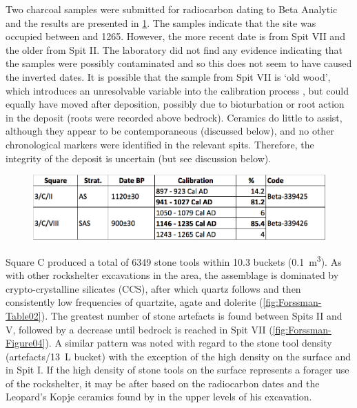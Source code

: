 \documentclass{ijsra}
\begin{document}
Two charcoal samples were submitted for radiocarbon dating to Beta Analytic and the results are presented in \cref{fig:Forssman-Table01}. 
The samples indicate that the site was occupied between  and 1265. 
However, the more recent date is from Spit VII and the older from Spit II. 
The laboratory did not find any evidence indicating that the samples were possibly contaminated and so this does not seem to have caused the inverted dates. 
It is possible that the sample from Spit VII is ‘old wood’, which introduces an unresolvable variable into the calibration process \parencite{Kennett_2002}, but could equally have moved after deposition, possibly due to bioturbation \parencite[see][]{Lancaster_2003} or root action in the deposit (roots were recorded above bedrock). 
Ceramics do little to assist, although they appear to be contemporaneous (discussed below), and no other chronological markers were identified in the relevant spits. Therefore, the integrity of the deposit is uncertain (but see discussion below).

	\begin{figure} %
		\includegraphics[width=\linewidth]{figures/Forssman-Table01}
		\label{fig:Forssman-Table01}
	\end{figure}


Square C  produced a total of \num{6349} stone tools within \num{10.3} buckets (\SI{0.1}{\meter\cubed}). 
As with other rockshelter excavations in the area, the assemblage is dominated by crypto-crystalline silicates (CCS), 
after which quartz follows and then consistently low frequencies of quartzite, agate and dolerite (\cref{fig:Forssman-Table02}). 
The greatest number of stone artefacts is found between Spits II and V, 
followed by a decrease until bedrock is reached in Spit VII (\cref{fig:Forssman-Figure04}).
A similar pattern was noted with regard to the stone tool density (artefacts/\SI{13}{\liter} bucket) with the exception of the high density on the surface and in Spit I. 
If the high density of stone tools on the surface represents a forager use of the rockshelter, it may be after  based on the radiocarbon dates and the Leopard’s Kopje ceramics found by \textcite{Walker_1994} in the upper levels of his excavation. 
\end{document}
